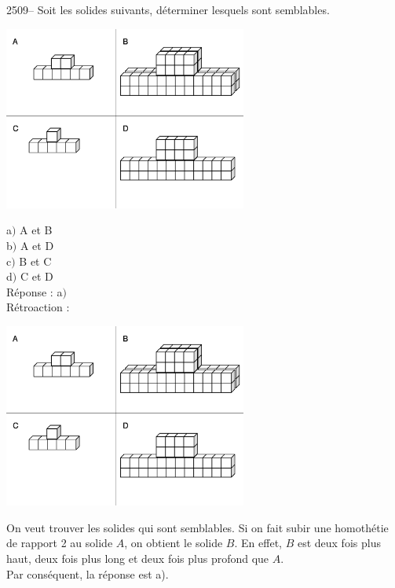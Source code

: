 \documentclass[letterpaper, 12pt]{article}
\begin{document}
2509-- Soit les solides suivants, d\'eterminer lesquels sont semblables.\\
\begin{center}
 \includegraphics[width=8cm,bb=0 0 735 555]{Q2509.eps}
\end{center}

a$)$ A et B\\
b$)$ A et D\\
c$)$ B et C\\
d$)$ C et D\\

R\'eponse : a$)$\\

R\'etroaction :\\
\begin{center}
 \includegraphics[width=8cm,bb=0 0 735 555]{Q2509.eps}
\end{center}
On veut trouver les solides qui sont semblables. Si on fait subir une homoth\'etie de rapport 2 au solide $A$, on obtient le solide $B$. En effet, $B$ est deux fois plus haut, deux fois plus long et deux fois plus profond que $A$.\\
Par cons\'equent, la r\'eponse est a).\\
\end{document}
